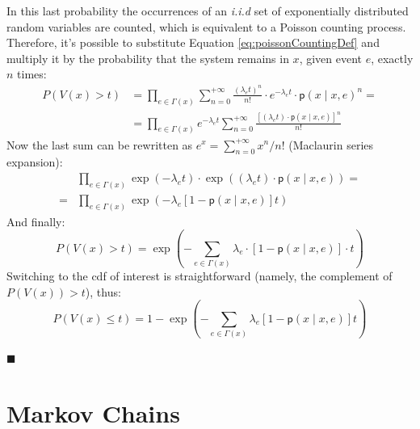 \documentclass[12pt,a4paper]{article}
\newcommand*{\transp}{\mathsf{p}}
\begin{document}
\noindent
In this last probability the occurrences of an \textit{i.i.d} set of exponentially distributed random variables are counted, which is equivalent to a Poisson counting process. Therefore, it's possible to substitute Equation \ref{eq:poissonCountingDef} and multiply it by the probability that the system remains in $x$, given event $e$, exactly $n$ times:
\begin{equation*}
\begin{aligned}
P(V(x) > t) & =\prod_{e\in\Gamma(x)}\sum_{n=0}^{+\infty}
\frac{(\lambda_e t)^n}{n!} \cdot e^{-\lambda_e t} \cdot \transp( x \mid x,e)^n = \\
&= \prod_{e\in\Gamma(x)}e^{-\lambda_e t}\sum_{n=0}^{+\infty} \frac{[(\lambda_e t)\cdot \transp (x \mid x,e)]^n}{n!}
\end{aligned}
\end{equation*}
Now the last sum can be rewritten as $e^x=\sum_{n=0}^{+\infty}x^n/n!$ (Maclaurin series expansion):
\begin{equation*}
\begin{aligned}
&\prod_{e\in\Gamma(x)}\exp(-\lambda_e t) \cdot
\exp((\lambda_e t) \cdot \transp(x \mid x,e)) = \\
=&\prod_{e\in\Gamma(x)}\exp(-\lambda_e [1 - \transp(x \mid x,e)] t)
\end{aligned}
\end{equation*}
And finally:
\begin{equation*}
P(V(x) > t) = \exp\left(- \sum_{e\in\Gamma(x)} \lambda_e \cdot [1 - \transp(x \mid x,e)] \cdot t\right)
\end{equation*}
Switching to the cdf of interest is straightforward (namely, the complement of $P(V(x)) > t$), thus:
\begin{equation*}
P\left(V(x)\leq t\right)=1- \exp\left(- \sum_{e\in\Gamma(x)} \lambda_e \left[1 - \transp(x \mid x,e)\right] t\right)
\end{equation*}
\begin{flushright}
$\blacksquare$
\end{flushright}
\section{Markov Chains}
\label{sec:MC}
\end{document}
